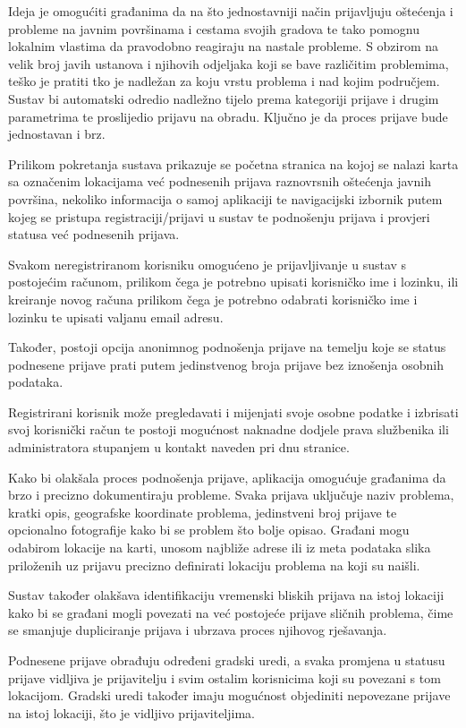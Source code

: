 Ideja je omogućiti građanima da na što jednostavniji način prijavljuju oštećenja i probleme na javnim površinama i cestama svojih gradova te tako pomognu lokalnim vlastima da pravodobno reagiraju na nastale probleme. S obzirom na velik broj javih ustanova i njihovih odjeljaka koji se bave različitim problemima, teško je pratiti tko je nadležan za koju vrstu problema i nad kojim područjem. Sustav bi automatski odredio nadležno tijelo prema kategoriji prijave i drugim parametrima te proslijedio prijavu na obradu. Ključno je da proces prijave bude jednostavan i brz.

Prilikom pokretanja sustava prikazuje se početna stranica na kojoj se nalazi karta sa označenim lokacijama već podnesenih prijava raznovrsnih oštećenja javnih površina, nekoliko informacija o samoj aplikaciji te navigacijski izbornik putem kojeg se pristupa registraciji/prijavi u sustav te podnošenju prijava i provjeri statusa već podnesenih prijava.

Svakom neregistriranom korisniku omogućeno je prijavljivanje u sustav s postojećim računom, prilikom čega je potrebno upisati korisničko ime i lozinku, ili kreiranje novog računa prilikom čega je potrebno odabrati korisničko ime i lozinku te upisati valjanu email adresu.

Također, postoji opcija anonimnog podnošenja prijave na temelju koje se status podnesene prijave prati putem jedinstvenog broja prijave bez iznošenja osobnih podataka.

Registrirani korisnik može pregledavati i mijenjati svoje osobne podatke i izbrisati svoj korisnički račun te postoji mogućnost naknadne dodjele prava službenika ili administratora stupanjem u kontakt naveden pri dnu stranice.

Kako bi olakšala proces podnošenja prijave, aplikacija omogućuje građanima da brzo i precizno dokumentiraju probleme. Svaka prijava uključuje naziv problema, kratki opis, geografske koordinate problema, jedinstveni broj prijave te opcionalno fotografije kako bi se problem što bolje opisao. Građani mogu odabirom lokacije na karti, unosom najbliže adrese ili iz meta podataka slika priloženih uz prijavu precizno definirati lokaciju problema na koji su naišli.

Sustav također olakšava identifikaciju vremenski bliskih prijava na istoj lokaciji kako bi se građani mogli povezati na već postojeće prijave sličnih problema, čime se smanjuje dupliciranje prijava i ubrzava proces njihovog rješavanja.

Podnesene prijave obrađuju određeni gradski uredi, a svaka promjena u statusu prijave vidljiva je prijavitelju i svim ostalim korisnicima koji su povezani s tom lokacijom. Gradski uredi također imaju mogućnost objediniti nepovezane prijave na istoj lokaciji, što je vidljivo prijaviteljima.

